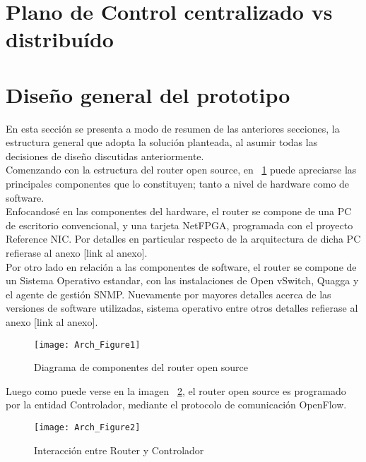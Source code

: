 \section[Alternativas de dise\~nio]{Plano de Control centralizado vs distribu\'ido}

\section[Dise\~no general del prototipo]{Dise\~no general del prototipo}

En esta secci\'on se presenta a modo de resumen de las anteriores secciones, la estructura general que adopta la soluci\'on planteada, al asumir todas las decisiones de dise\~no discutidas anteriormente.\\

Comenzando con la estructura del router open source, en ~\ref{fig:OpenSourceRArch} puede apreciarse las principales componentes que lo constituyen; tanto a nivel de hardware como de software.\\
Enfocandos\'e en las componentes del hardware, el router se compone de una PC de escritorio convencional, y una tarjeta NetFPGA, programada con el proyecto Reference NIC. Por detalles en particular respecto de la arquitectura de dicha PC refierase al anexo [link al anexo].\\  
Por otro lado en relaci\'on a las componentes de software, el router se compone de un Sistema Operativo estandar, con las instalaciones de Open vSwitch, Quagga y el agente de gesti\'on SNMP. Nuevamente por mayores detalles acerca de las versiones de software utilizadas, sistema operativo entre otros detalles refierase al anexo [link al anexo].\\

\newpage
\begin{figure}[htbp!] 
\centering    
\texttt{[image: Arch\_Figure1]}
\caption[OpenSourceRArch]{Diagrama de componentes del router open source}
\label{fig:OpenSourceRArch}
\end{figure}

Luego como puede verse en la imagen ~\ref{fig:OpenSourceRArch2}, el router open source es programado por la entidad Controlador, mediante el protocolo de comunicaci\'on OpenFlow.


\begin{figure}[htbp!] 
\centering    
\texttt{[image: Arch\_Figure2]}
\caption[OpenSourceRArch2]{Interacci\'on entre Router y Controlador}
\label{fig:OpenSourceRArch2}
\end{figure}

